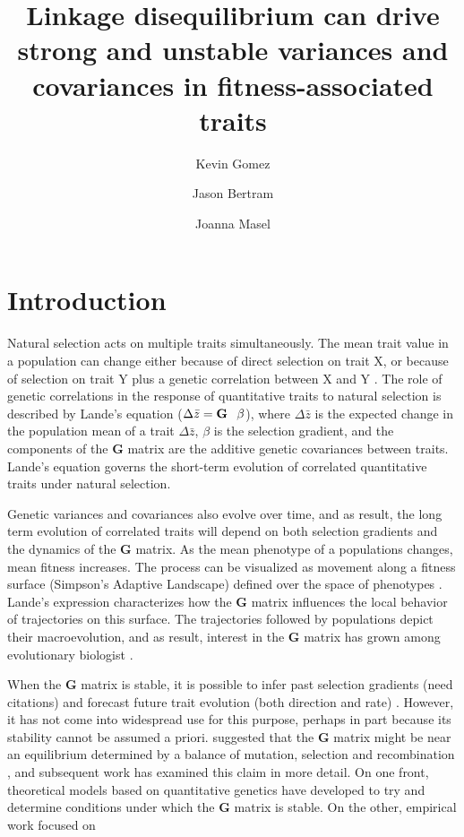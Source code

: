 \documentclass[9pt,twocolumn,twoside]{gsajnl}
\title{Linkage disequilibrium can drive strong and unstable variances and covariances in fitness-associated traits}
\author[$\ast$,1]{Kevin Gomez}
\author[$\dagger$]{Jason Bertram}
\author[$\dagger$]{Joanna Masel}
\affil[$\ast$]{Graduate Interdisciplinary Program in Applied Mathematics, University of Arizona, and}
\affil[$\dagger$]{Department of Evolution and Ecology, University of Arizona}
\newcommand{\G}{\textbf{G }}
\begin{document}
\maketitle
\thispagestyle{firststyle}
\marginmark
\firstpagefootnote
{}
\vspace{-11pt}%

\section{Introduction}

Natural selection acts on multiple traits simultaneously. The mean trait value in a population can change either because of direct selection on trait X, or because of selection on trait Y plus a genetic correlation between X and Y \citep{lande1979quantitative,lande1983measurement}. The role of genetic correlations in the response of quantitative traits to natural selection is described by Lande's equation ($\Delta \bar{z} = \G \hspace{.05in}\beta$), where $\Delta \bar{z}$ is the expected change in the population mean of a trait $\Delta \bar{z}$, $\beta$ is the selection gradient, and the components of the \G  matrix are the additive genetic covariances between traits. Lande's equation governs the short-term evolution of correlated quantitative traits under natural selection. 

Genetic variances and covariances also evolve over time, and as result, the long term evolution of correlated traits will depend on both selection gradients and the dynamics of the \G matrix. As the mean phenotype of a populations changes, mean fitness increases. The process can be visualized as movement along a fitness surface (Simpson's Adaptive Landscape) defined over the space of phenotypes \cite{phillips1989visualizing}. Lande's expression characterizes how the \G matrix influences the local behavior of trajectories on this surface. The trajectories followed by populations depict their macroevolution, and as result, interest in the \G matrix has grown among evolutionary biologist \cite{Arnold2001,Arnold2008}. 

When the \G matrix is stable, it is possible to infer past selection gradients (need citations) and forecast future trait evolution (both direction and rate) \citep{teplitsky2014assessing,teplitsky2011quantitative,Schluter1996}. However, it has not come into widespread use for this purpose, perhaps in part because its stability cannot be assumed a priori. \cite[p.407]{lande1979quantitative} suggested that the \G matrix might be near an equilibrium determined by a balance of mutation, selection and recombination \cite{lande1977influence, lande1980genetic}, and subsequent work has examined this claim in more detail. On one front, theoretical models based on quantitative genetics have developed to try and determine conditions under which the \G matrix is stable. On the other, empirical work focused on 
\end{document}
